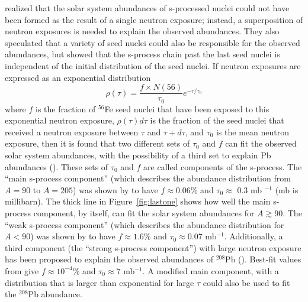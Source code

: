 \cite{claytonetal1961} realized that the solar system
abundances of s-processed nuclei could not have been formed as the
result of a single neutron exposure; instead, a superposition of
neutron exposures is needed to explain the observed abundances. They
also speculated that a variety of seed nuclei could also be
responsible for the observed abundances, but \cite{clayton1974} showed
that the s-process chain past the last seed nuclei is independent of
the initial distribution of the seed nuclei.  If  neutron exposures are
expressed as an exponential distribution
\begin{equation}
\label{eq:exp}
\rho(\tau)=\frac{f\times N(56)}{\tau_0}e^{-\tau/\tau_0}
\end{equation}
where $f$ is the fraction of $^{56}$Fe seed nuclei that have been
exposed to this exponential neutron exposure, $\rho(\tau)d\tau$ is the
fraction of the seed nuclei that
received a neutron exposure between $\tau$ and $\tau + d\tau$, and 
$\tau_0$ is the mean neutron exposure, then it is found that two
different sets of $\tau_0$ and $f$ can fit the observed solar system
abundances, with the possibility of a third set to explain Pb
abundances (\citealt{iliadis2008}).  These sets of $\tau_0$ and $f$
  are called components of the s-process.  The ``main
s-process component'' (which describes the abundance distribution from
$A=90$ to $A=205$) was shown by \cite{kappeleretal1990} to have $f\approx 0.06\%$ and $\tau_0\approx$ 0.3 mb
$^{-1}$ (mb is millibarn).  The thick
line in Figure~\ref{fig:lastone} shows how well the main s-process
component, by itself, can fit the solar system abundances for
$A\gtrsim90$.  The ``weak s-process component'' (which describes
the abundance distribution for $A<90$)   was shown by
\cite{kappeleretal1990} to have $f\approx1.6\%$ and $\tau_0\approx 0.07$
mb$^{-1}$.  
 Additionally, a third component (the ``strong
s-process component'') with large neutron exposure has been proposed
to explain the observed
abundances of $^{208}$Pb (\citealt{clayton1967}).  Best-fit values
from \cite{kappeleretal1990} give $f\approx 10^{-4}$\% and $\tau_0\approx
7$ mb$^{-1}$.  A modified main component, with a distribution that is
larger than exponential for large $\tau$ could also be used to fit the
$^{208}$Pb abundance.
